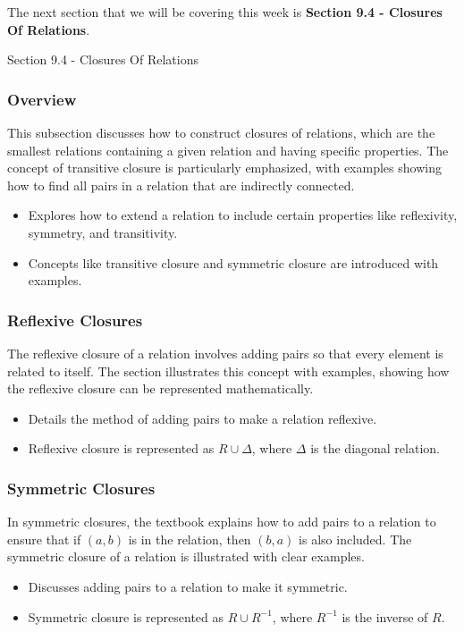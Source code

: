 The next section that we will be covering this week is \textbf{Section 9.4 - Closures Of Relations}.

\begin{notes}{Section 9.4 - Closures Of Relations}
    \subsubsection*{Overview}
    This subsection discusses how to construct closures of relations, which are the smallest relations containing a given relation and having specific properties. The concept of transitive closure is 
    particularly emphasized, with examples showing how to find all pairs in a relation that are indirectly connected.
    \begin{itemize}
        \item Explores how to extend a relation to include certain properties like reflexivity, symmetry, and transitivity.
        \item Concepts like transitive closure and symmetric closure are introduced with examples.
    \end{itemize}
    
    \subsubsection*{Reflexive Closures}
    The reflexive closure of a relation involves adding pairs so that every element is related to itself. The section illustrates this concept with examples, showing how the reflexive closure can be 
    represented mathematically.
    \begin{itemize}
        \item Details the method of adding pairs to make a relation reflexive.
        \item Reflexive closure is represented as $R \cup \Delta$, where $\Delta$ is the diagonal relation.
    \end{itemize}
    
    \subsubsection*{Symmetric Closures}
    In symmetric closures, the textbook explains how to add pairs to a relation to ensure that if $(a, b)$ is in the relation, then $(b, a)$ is also included. The symmetric closure of a 
    relation is illustrated with clear examples.
    \begin{itemize}
        \item Discusses adding pairs to a relation to make it symmetric.
        \item Symmetric closure is represented as $R \cup R^{-1}$, where $R^{-1}$ is the inverse of $R$.
    \end{itemize}
    

\end{notes}
